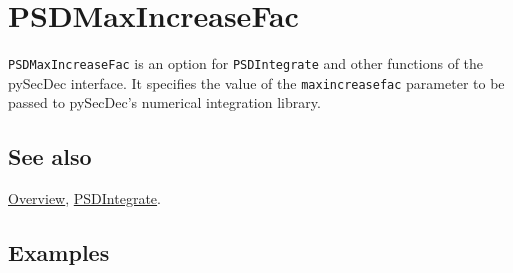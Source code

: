 \documentclass[../FeynHelpersManual.tex]{subfiles}
\begin{document}
\hypertarget{psdmaxincreasefac}{
\section{PSDMaxIncreaseFac}\label{psdmaxincreasefac}}

\texttt{PSDMaxIncreaseFac} is an option for \texttt{PSDIntegrate} and
other functions of the pySecDec interface. It specifies the value of the
\texttt{maxincreasefac} parameter to be passed to pySecDec's numerical
integration library.

\subsection{See also}

\hyperlink{toc}{Overview}, \hyperlink{psdintegrate}{PSDIntegrate}.

\subsection{Examples}
\end{document}
